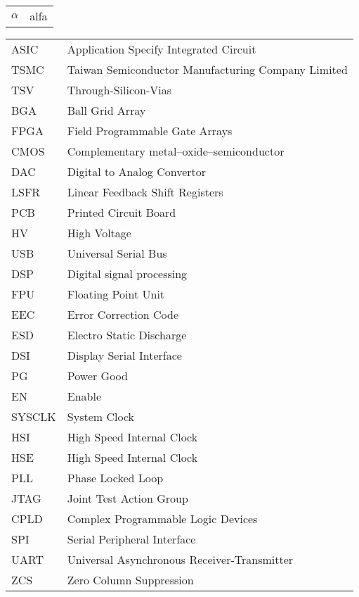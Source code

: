 \begin{tabular}{ l  l }
	
	$\alpha$ 			& alfa 				\\
	
\end{tabular}

\begin{tabular}{ l  l }
	
	ASIC & Application Specify Integrated Circuit \\
	TSMC & Taiwan Semiconductor Manufacturing Company Limited \\ 
	TSV	 & Through-Silicon-Vias \\
	BGA & Ball Grid Array \\
	FPGA & Field Programmable Gate Arrays \\
	CMOS & Complementary metal–oxide–semiconductor \\
	DAC & Digital to Analog Convertor \\
	LSFR & Linear Feedback Shift Registers \\
	PCB & Printed Circuit Board \\
	HV & High Voltage \\
	USB & Universal Serial Bus \\
	DSP & Digital signal processing \\
	FPU & Floating Point Unit \\
	EEC & Error Correction Code \\
	ESD & Electro Static Discharge \\
	DSI & Display Serial Interface \\
	PG & Power Good \\
	EN & Enable \\
	SYSCLK & System Clock \\
	HSI & High Speed Internal Clock \\
	HSE & High Speed Internal Clock \\
	PLL & Phase Locked Loop \\
	JTAG & Joint Test Action Group \\
	CPLD & Complex Programmable Logic Devices \\
	SPI & Serial Peripheral Interface \\
	UART & Universal Asynchronous Receiver-Transmitter \\
	ZCS & Zero Column Suppression \\
	
	
		
\end{tabular}